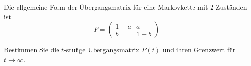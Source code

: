 \begin{Exercise}[label=ex:4.4]
Die allgemeine Form der Übergangsmatrix für eine Markovkette mit 2 Zuständen ist
\[P=\left(\begin{array}{cc}
1-a & a\\
b & 1-b
\end{array}\right)\]

Bestimmen Sie die $t$-stufige Ubergangsmatrix $P(t)$ und ihren Grenzwert für $t\rightarrow\infty$.
\end{Exercise}
\begin{Answer}
\end{Answer}
